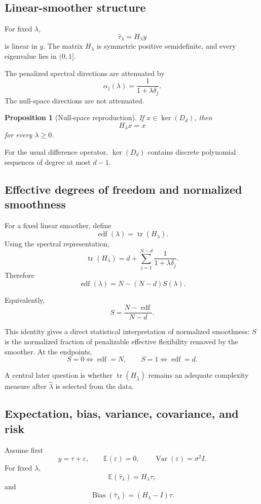 \documentclass[11pt]{article}
\newtheorem{proposition}{Proposition}
\newcommand{\E}{\mathbb E}
\newcommand{\Var}{\operatorname{Var}}
\newcommand{\tr}{\operatorname{tr}}
\begin{document}
\subsection{Linear-smoother structure}

For fixed \(\lambda\),
\[
\widehat\tau_\lambda=H_\lambda y
\]
is linear in \(y\). The matrix \(H_\lambda\) is symmetric positive
semidefinite, and every eigenvalue lies in \((0,1]\).

The penalized spectral directions are attenuated by
\[
\alpha_j(\lambda)=\frac1{1+\lambda\delta_j}.
\]
The null-space directions are not attenuated.

\begin{proposition}[Null-space reproduction]
If \(x\in\ker(D_d)\), then
\[
H_\lambda x=x
\]
for every \(\lambda\ge0\).
\end{proposition}

For the usual difference operator, \(\ker(D_d)\) contains discrete polynomial
sequences of degree at most \(d-1\).

\subsection{Effective degrees of freedom and normalized smoothness}

For a fixed linear smoother, define
\[
\operatorname{edf}(\lambda)=\tr(H_\lambda).
\]
Using the spectral representation,
\[
\tr(H_\lambda)
=
d
+
\sum_{j=1}^{N-d}
\frac1{1+\lambda\delta_j}.
\]
Therefore
\[
\boxed{
\operatorname{edf}(\lambda)
=
N-(N-d)S(\lambda).
}
\]

Equivalently,
\[
\boxed{
S
=
\frac{N-\operatorname{edf}}{N-d}.
}
\]

This identity gives a direct statistical interpretation of normalized
smoothness: \(S\) is the normalized fraction of penalizable effective
flexibility removed by the smoother. At the endpoints,
\[
S=0\Longleftrightarrow\operatorname{edf}=N,
\qquad
S=1\Longleftrightarrow\operatorname{edf}=d.
\]

A central later question is whether \(\tr(H_{\widehat\lambda})\) remains an
adequate complexity measure after \(\widehat\lambda\) is selected from the data.

\subsection{Expectation, bias, variance, covariance, and risk}

Assume first
\[
y=\tau+\varepsilon,
\qquad
\E(\varepsilon)=0,
\qquad
\Var(\varepsilon)=\sigma^2I.
\]
For fixed \(\lambda\),
\[
\E(\widehat\tau_\lambda)
=
H_\lambda\tau,
\]
and
\[
\boxed{
\operatorname{Bias}(\widehat\tau_\lambda)
=
(H_\lambda-I)\tau.
}
\]
\end{document}
